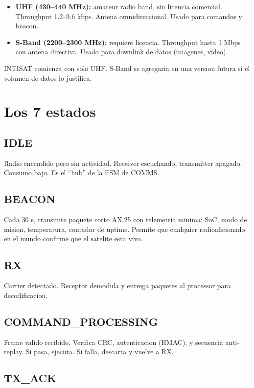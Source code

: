 \documentclass[11pt,a4paper,oneside,openright]{book}
\begin{document}
\begin{itemize}[leftmargin=2em]
  \item \textbf{UHF (430--440 MHz):} amateur radio band, sin licencia
    comercial. Throughput 1.2--9.6 kbps. Antena omnidireccional.
    Usado para comandos y beacon.
  \item \textbf{S-Band (2200--2300 MHz):} requiere licencia. Throughput
    hasta 1 Mbps con antena directiva. Usado para downlink de datos
    (imagenes, video).
\end{itemize}

INTISAT comienza con solo UHF. S-Band se agregaria en una version
futura si el volumen de datos lo justifica.

\section{Los 7 estados}

\subsection*{IDLE}

Radio encendido pero sin actividad. Receiver escuchando, transmitter
apagado. Consumo bajo. Es el ``hub'' de la FSM de COMMS.

\subsection*{BEACON}

Cada 30 s, transmite paquete corto AX.25 con telemetria minima: SoC,
modo de mision, temperatura, contador de uptime. Permite que cualquier
radioaficionado en el mundo confirme que el satelite esta vivo.

\subsection*{RX}

Carrier detectado. Receptor demodula y entrega paquetes al
processor para decodificacion.

\subsection*{COMMAND\_PROCESSING}

Frame valido recibido. Verifica CRC, autenticacion (HMAC), y
secuencia anti-replay. Si pasa, ejecuta. Si falla, descarta y vuelve
a RX.

\subsection*{TX\_ACK}
\end{document}
